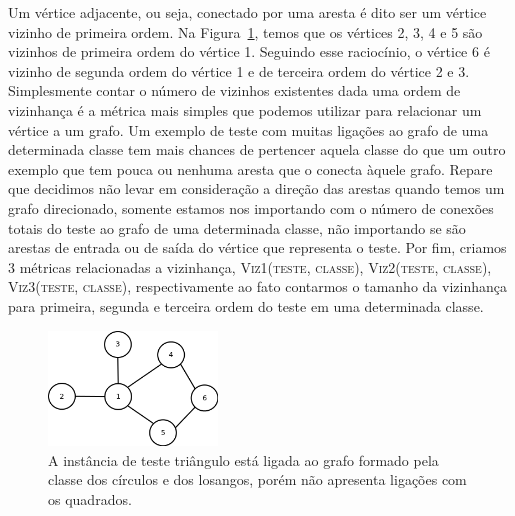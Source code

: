 Um vértice adjacente, ou seja, conectado por uma aresta é dito ser um vértice vizinho de primeira ordem. Na Figura~\ref{fig::vizinhos}, temos que os vértices 2, 3, 4 e 5 são vizinhos de primeira ordem do vértice 1. Seguindo esse raciocínio, o vértice 6 é vizinho de segunda ordem do vértice 1 e de terceira ordem do vértice 2 e 3. Simplesmente contar o número de vizinhos existentes dada uma ordem de vizinhança é a métrica mais simples que podemos utilizar para relacionar um vértice a um grafo. Um exemplo de teste com muitas ligações ao grafo de uma determinada classe tem mais chances de pertencer aquela classe do que um outro exemplo que tem pouca ou nenhuma aresta que o conecta àquele grafo. Repare que decidimos não levar em consideração a direção das arestas quando temos um grafo direcionado, somente estamos nos importando com o número de conexões totais do teste ao grafo de uma determinada classe, não importando se são arestas de entrada ou de saída do vértice que representa o teste. Por fim, criamos 3 métricas relacionadas a vizinhança, \textsc{Viz1(teste, classe)}, \textsc{Viz2(teste, classe)}, \textsc{Viz3(teste, classe)}, respectivamente ao fato contarmos o tamanho da vizinhança para primeira, segunda e terceira ordem do teste em uma determinada classe.

\begin{figure}[ht!]
\centering
\includegraphics[width=0.4\textwidth]{figures/vizinhos.png}
\caption{A instância de teste triângulo está ligada ao grafo formado pela classe dos círculos e dos losangos, porém não apresenta ligações com os quadrados.}
\label{fig::vizinhos}
\end{figure}


